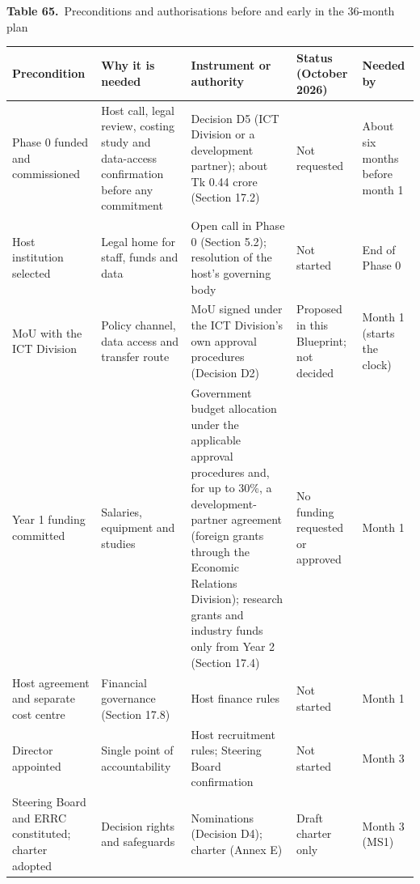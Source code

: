 \documentclass[border=10pt]{standalone}
\begin{document}
\begin{minipage}{17cm}
{\large\bfseries Table 65.}\ {\large Preconditions and authorisations before and early in the 36-month plan}\par\vspace{7pt}
\small
{}
\begin{tabularx}{\linewidth}{@{}>{\hsize=1.170\hsize\raggedright\arraybackslash}X>{\hsize=1.011\hsize\raggedright\arraybackslash}X>{\hsize=1.383\hsize\raggedright\arraybackslash}X>{\hsize=0.798\hsize\raggedright\arraybackslash}X>{\hsize=0.638\hsize\raggedright\arraybackslash}X@{}}
\arrayrulecolor{bapilrule}\toprule
\rowcolor{white}\textbf{Precondition} & \textbf{Why it is needed} & \textbf{Instrument or authority} & \textbf{Status (October 2026)} & \textbf{Needed by} \\
\midrule
Phase 0 funded and commissioned & Host call, legal review, costing study and data-access confirmation before any commitment & Decision D5 (ICT Division or a development partner); about Tk 0.44 crore (Section 17.2) & Not requested & About six months before month 1 \\
Host institution selected & Legal home for staff, funds and data & Open call in Phase 0 (Section 5.2); resolution of the host’s governing body & Not started & End of Phase 0 \\
MoU with the ICT Division & Policy channel, data access and transfer route & MoU signed under the ICT Division’s own approval procedures (Decision D2) & Proposed in this Blueprint; not decided & Month 1 (starts the clock) \\
Year 1 funding committed & Salaries, equipment and studies & Government budget allocation under the applicable approval procedures and, for up to 30\%, a development-partner agreement (foreign grants through the Economic Relations Division); research grants and industry funds only from Year 2 (Section 17.4) & No funding requested or approved & Month 1 \\
Host agreement and separate cost centre & Financial governance (Section 17.8) & Host finance rules & Not started & Month 1 \\
Director appointed & Single point of accountability & Host recruitment rules; Steering Board confirmation & Not started & Month 3 \\
Steering Board and ERRC constituted; charter adopted & Decision rights and safeguards & Nominations (Decision D4); charter (Annex E) & Draft charter only & Month 3 (MS1) \\

\end{tabularx}
\end{minipage}
\end{document}
